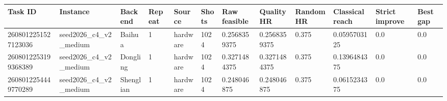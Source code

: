 \begin{tabular}{llllllllllll}
\toprule
Task ID & Instance & Backend & Repeat & Source & Shots & Raw feasible & Quality HR & Random HR & Classical reach & Strict improve & Best gap \\
\midrule
2608012251527123036 & seed2026\_c4\_v2\_medium & Baihua & 1 & hardware & 1024 & 0.2568359375 & 0.2568359375 & 0.375 & 0.0595703125 & 0.0 & 0.0 \\
2608012253199368389 & seed2026\_c4\_v2\_medium & Dongling & 1 & hardware & 1024 & 0.3271484375 & 0.3271484375 & 0.375 & 0.1396484375 & 0.0 & 0.0 \\
2608012254449770289 & seed2026\_c4\_v2\_medium & Shenglian & 1 & hardware & 1024 & 0.248046875 & 0.248046875 & 0.375 & 0.0615234375 & 0.0 & 0.0 \\
\bottomrule
\end{tabular}
